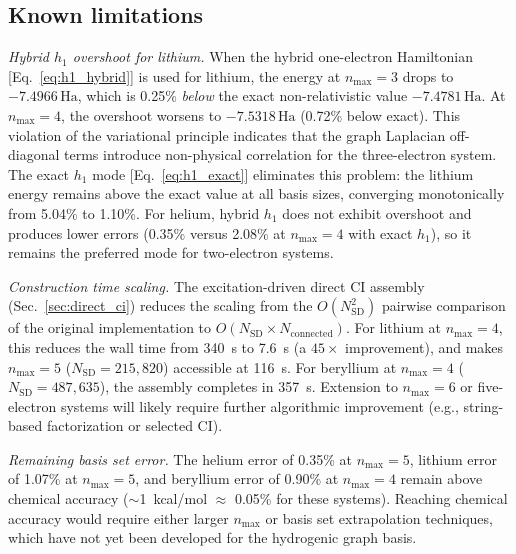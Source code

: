 \documentclass[aps,pra,twocolumn,superscriptaddress,longbibliography,floatfix]{revtex4-2}
\begin{document}
\subsection{Known limitations}
\label{sec:limitations}

\emph{Hybrid $h_1$ overshoot for lithium.}
When the hybrid one-electron Hamiltonian [Eq.~\eqref{eq:h1_hybrid}]
is used for lithium, the energy at $n_{\max}=3$ drops to
$-7.4966\,\text{Ha}$, which is 0.25\% \emph{below} the exact
non-relativistic value $-7.4781\,\text{Ha}$.
At $n_{\max}=4$, the overshoot worsens to $-7.5318\,\text{Ha}$
(0.72\% below exact).
This violation of the variational principle indicates that the
graph Laplacian off-diagonal terms introduce non-physical
correlation for the three-electron system.
The exact $h_1$ mode [Eq.~\eqref{eq:h1_exact}] eliminates this
problem: the lithium energy remains above the exact value at all
basis sizes, converging monotonically from 5.04\% to 1.10\%.
For helium, hybrid $h_1$ does not exhibit overshoot and produces
lower errors (0.35\% versus 2.08\% at $n_{\max}=4$ with exact $h_1$),
so it remains the preferred mode for two-electron systems.

\emph{Construction time scaling.}
The excitation-driven direct CI assembly
(Sec.~\ref{sec:direct_ci}) reduces the scaling from the
$O(N_{\text{SD}}^2)$ pairwise comparison of the original
implementation to $O(N_{\text{SD}} \times N_{\text{connected}})$.
For lithium at $n_{\max}=4$, this reduces the wall time from
340~s to 7.6~s (a $45\times$ improvement), and makes $n_{\max}=5$
($N_{\text{SD}} = 215{,}820$) accessible at 116~s.
For beryllium at $n_{\max}=4$ ($N_{\text{SD}} = 487{,}635$), the
assembly completes in 357~s.
Extension to $n_{\max}=6$ or five-electron systems will likely
require further algorithmic improvement (e.g., string-based
factorization or selected CI).

\emph{Remaining basis set error.}
The helium error of 0.35\% at $n_{\max}=5$, lithium error of
1.07\% at $n_{\max}=5$, and beryllium error of 0.90\% at
$n_{\max}=4$ remain above chemical accuracy
($\sim$1~kcal/mol $\approx$ 0.05\% for these systems).
Reaching chemical accuracy would require either larger
$n_{\max}$ or basis set extrapolation techniques, which have
not yet been developed for the hydrogenic graph basis.
\end{document}
